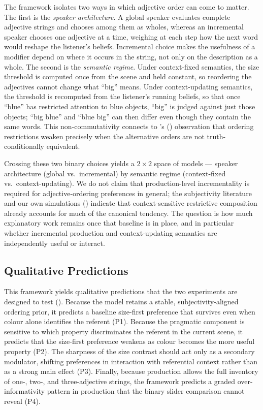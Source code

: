 \documentclass[man,floatsintext]{apa7}
\begin{document}
The framework isolates two ways in which adjective order can come to matter.
The first is the \emph{speaker architecture}.
A global speaker evaluates complete adjective strings and chooses among them as wholes, whereas an incremental speaker chooses one adjective at a time, weighing at each step how the next word would reshape the listener's beliefs.
Incremental choice makes the usefulness of a modifier depend on where it occurs in the string, not only on the description as a whole.
The second is the \emph{semantic regime}.
Under context-fixed semantics, the size threshold is computed once from the scene and held constant, so reordering the adjectives cannot change what ``big'' means.
Under context-updating semantics, the threshold is recomputed from the listener's running beliefs, so that once ``blue'' has restricted attention to blue objects, ``big'' is judged against just those objects; ``big blue'' and ``blue big'' can then differ even though they contain the same words.
This non-commutativity connects to \citeauthor{teodorescu2006}'s (\citeyear{teodorescu2006}) observation that ordering restrictions weaken precisely when the alternative orders are not truth-conditionally equivalent.

Crossing these two binary choices yields a $2 \times 2$ space of models --- speaker architecture (global vs.\ incremental) by semantic regime (context-fixed vs.\ context-updating).
We do not claim that production-level incrementality is required for adjective-ordering preferences in general; the subjectivity literature and our own simulations () indicate that context-sensitive restrictive composition already accounts for much of the canonical tendency.
The question is how much explanatory work remains once that baseline is in place, and in particular whether incremental production and context-updating semantics are independently useful or interact.

\subsection{Qualitative Predictions}
\label{sec:framework:predictions}

This framework yields qualitative predictions that the two experiments are designed to test ().
Because the model retains a stable, subjectivity-aligned ordering prior, it predicts a baseline size-first preference that survives even when colour alone identifies the referent (P1).
Because the pragmatic component is sensitive to which property discriminates the referent in the current scene, it predicts that the size-first preference weakens as colour becomes the more useful property (P2).
The sharpness of the size contrast should act only as a secondary modulator, shifting preferences in interaction with referential context rather than as a strong main effect (P3).
Finally, because production allows the full inventory of one-, two-, and three-adjective strings, the framework predicts a graded over-informativity pattern in production that the binary slider comparison cannot reveal (P4).
\end{document}

